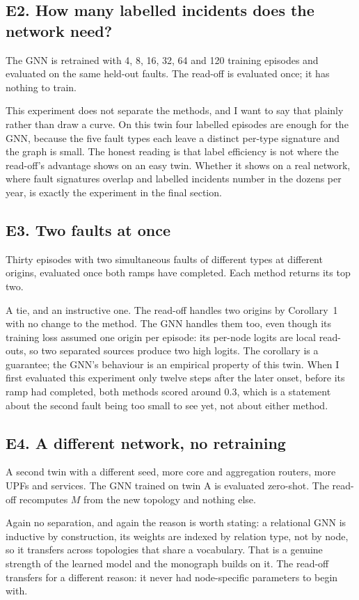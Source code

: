 \documentclass[11pt,a4paper]{article}
\begin{document}
\subsection*{E2. How many labelled incidents does the network need?}
The GNN is retrained with 4, 8, 16, 32, 64 and 120 training episodes and evaluated on the same
held-out faults. The read-off is evaluated once; it has nothing to train.

This experiment does not separate the methods, and I want to say that plainly rather than draw a
curve. On this twin four labelled episodes are enough for the GNN, because the five fault types
each leave a distinct per-type signature and the graph is small. The honest reading is that label
efficiency is not where the read-off's advantage shows on an easy twin. Whether it shows on a real
network, where fault signatures overlap and labelled incidents number in the dozens per year, is
exactly the experiment in the final section.

\subsection*{E3. Two faults at once}
Thirty episodes with two simultaneous faults of different types at different origins, evaluated
once both ramps have completed. Each method returns its top two.

A tie, and an instructive one. The read-off handles two origins by Corollary~1 with no change to
the method. The GNN handles them too, even though its training loss assumed one origin per
episode: its per-node logits are local read-outs, so two separated sources produce two high
logits. The corollary is a guarantee; the GNN's behaviour is an empirical property of this twin.
When I first evaluated this experiment only twelve steps after the later onset, before its ramp
had completed, both methods scored around 0.3, which is a statement about the second fault being
too small to see yet, not about either method.

\subsection*{E4. A different network, no retraining}
A second twin with a different seed, more core and aggregation routers, more UPFs and services. The
GNN trained on twin A is evaluated zero-shot. The read-off recomputes $M$ from the new topology and
nothing else.

Again no separation, and again the reason is worth stating: a relational GNN is inductive by
construction, its weights are indexed by relation type, not by node, so it transfers across
topologies that share a vocabulary. That is a genuine strength of the learned model and the
monograph builds on it. The read-off transfers for a different reason: it never had node-specific
parameters to begin with.
\end{document}
